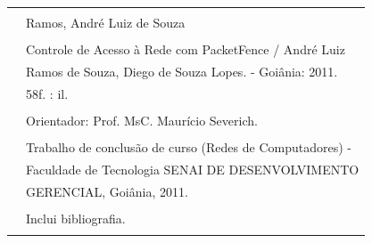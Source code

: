 \documentclass[12pt, brazil, ruledheader, pnumromarab,normaltoc]{abnt}
\begin{document}
\begin{minipage}{7cm}
\begin{center}
\vspace{.15\textwidth}
\begin{tabular}{|cl|} \hline
  \hspace{1.3cm} & \\
  & Ramos, André Luiz de Souza\\
  & \\
  \hspace{0.2cm}  & \hspace{0.3cm} Controle de Acesso à Rede com PacketFence / André Luiz\\
  &  Ramos de Souza, Diego de Souza Lopes. - Goiânia: 2011.\\
  & \hspace{0.65cm} 58f. : il. \\
  & \\
  & \hspace{0.6cm} Orientador: Prof. MsC. Maurício Severich.\\
  & \\
  & \hspace{0.6cm} Trabalho de conclusão de curso (Redes de Computadores) -\\
  & \hspace{0.6cm} Faculdade de Tecnologia SENAI DE DESENVOLVIMENTO \\
  & \hspace{0.6cm} GERENCIAL, Goiânia, 2011.\\
  & \\
  & \hspace{0.6cm} Inclui bibliografia. \\
  & \\
 \hline
\end{tabular}
\end{center}
\end{minipage}
\end{document}
